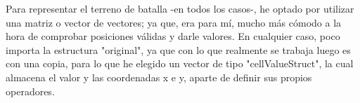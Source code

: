 Para representar el terreno de batalla -en todos los casos-, he optado por utilizar una matriz o vector de vectores; ya que, era para mí, mucho más cómodo a la hora de comprobar posiciones válidas y darle valores. En cualquier caso, poco importa la estructura "original", ya que con lo que realmente se trabaja luego es con una copia, para lo que he elegido un vector de tipo "cellValueStruct", la cual almacena el valor y las coordenadas x e y, aparte de definir sus propios operadores.